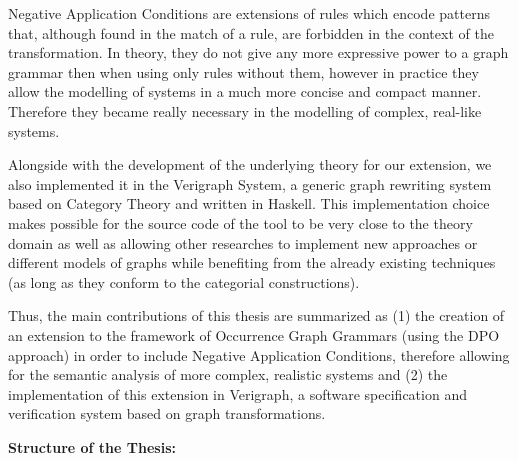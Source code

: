 Negative Application Conditions are extensions of rules which encode patterns that, although found in the match of a rule, are forbidden in the context of the transformation. In theory, they do not give any more expressive power to a graph grammar then when using only rules without them, however in practice they allow the modelling of systems in a much more concise and compact manner. Therefore they became really necessary in the modelling of complex, real-like systems.

Alongside with the development of the underlying theory for our extension, we also implemented it in the Verigraph System, a generic graph rewriting system based on Category Theory and written in Haskell. This implementation choice makes possible for the source code of the tool to be very close to the theory domain as well as allowing other researches to implement new approaches or different models of graphs while benefiting from the already existing techniques (as long as they conform to the categorial constructions).



Thus, the main contributions of this thesis are summarized as (1) the creation of an extension  to the framework of Occurrence Graph Grammars (using the DPO approach) in order to include Negative Application Conditions, therefore allowing for the semantic analysis of more complex, realistic systems and (2) the implementation of this extension in Verigraph, a software specification and verification system based on graph transformations.

\hfill \break
\textbf{Structure of the Thesis:}

